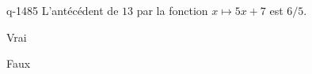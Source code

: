\begin{truefalse}{q-1485}
L'antécédent de $13$ par la fonction $x\mapsto 5x+7$ est $6/5$.
\item* Vrai
\item Faux
\end{truefalse}

